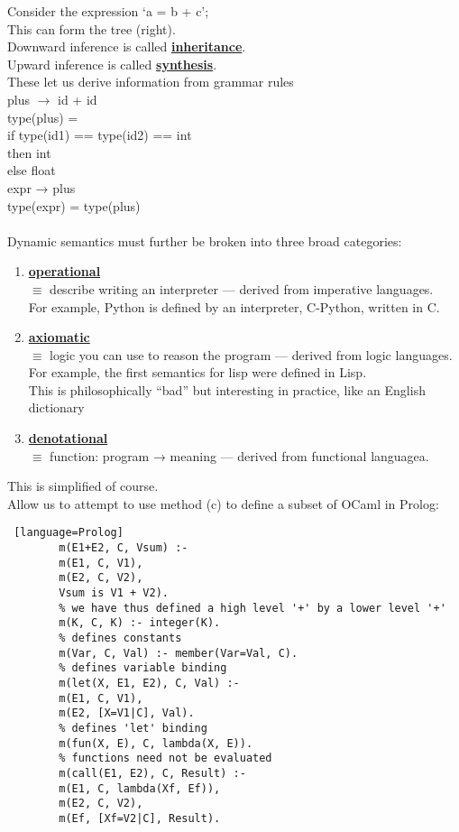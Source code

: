 \documentclass[../../lecture_notes.tex]{subfiles}
\begin{document}
Consider the expression ‘a = b + c’;\\
\indent This can form the tree (right).\\
Downward inference is called \textbf{\underline{inheritance}}.\\
Upward inference is called \textbf{\underline{synthesis}}.\\
These let us derive information from grammar rules\\
\indent plus $\rightarrow$ id + id\\
\indent \indent type(plus) = \\
\indent \indent if type(id1) == type(id2) == int\\
\indent \indent then int\\
\indent \indent else float\\
\indent expr → plus\\
 \indent \indent type(expr) = type(plus)\\
\\ 
 Dynamic semantics must further be broken into three broad categories:
 \begin{enumerate} [itemsep=0mm]
	\item \textbf{\underline{operational}}\\
		$\equiv$ describe writing an interpreter — derived from imperative languages.\\
		For example, Python is defined by an interpreter, C-Python, written in C.
	\item \textbf{\underline{axiomatic}}\\
		$\equiv$ logic you can use to reason the program — derived from logic languages.\\
		For example, the first semantics for lisp were defined in Lisp.\\
		This is philosophically “bad” but interesting in practice, like an English dictionary
	\item \textbf{\underline{denotational}}\\
		$\equiv$ function: program → meaning — derived from functional languagea.
\end{enumerate}
\noindent This is simplified of course.
\\
Allow us to attempt to use method (c) to define a subset of OCaml in Prolog:\\
\begin{lstlisting} [language=Prolog]
		m(E1+E2, C, Vsum) :-
		m(E1, C, V1),
		m(E2, C, V2),
		Vsum is V1 + V2).
		% we have thus defined a high level '+' by a lower level '+'
		m(K, C, K) :- integer(K).
		% defines constants
		m(Var, C, Val) :- member(Var=Val, C).
		% defines variable binding
		m(let(X, E1, E2), C, Val) :-
		m(E1, C, V1),
		m(E2, [X=V1|C], Val).
		% defines 'let' binding
		m(fun(X, E), C, lambda(X, E)).
		% functions need not be evaluated
		m(call(E1, E2), C, Result) :-
		m(E1, C, lambda(Xf, Ef)),
		m(E2, C, V2),
		m(Ef, [Xf=V2|C], Result).
\end{lstlisting}
\end{document}
